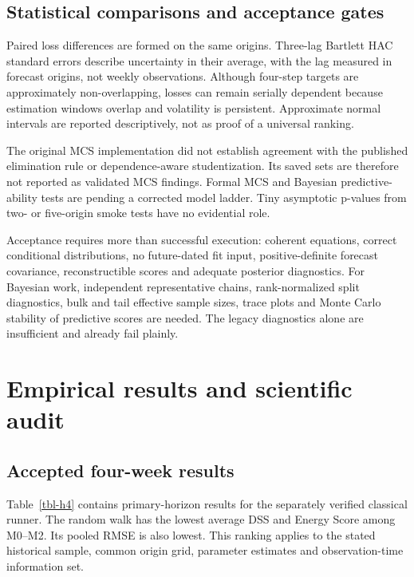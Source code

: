 \documentclass[
  12pt,
  letterpaper,
  DIV=11,
  numbers=noendperiod]{scrreprt}
\begin{document}
\section{Statistical comparisons and acceptance
gates}\label{statistical-comparisons-and-acceptance-gates}

Paired loss differences are formed on the same origins. Three-lag
Bartlett HAC standard errors describe uncertainty in their average, with
the lag measured in forecast origins, not weekly observations. Although
four-step targets are approximately non-overlapping, losses can remain
serially dependent because estimation windows overlap and volatility is
persistent. Approximate normal intervals are reported descriptively, not
as proof of a universal ranking.

The original MCS implementation did not establish agreement with the
published elimination rule or dependence-aware studentization. Its saved
sets are therefore not reported as validated MCS findings. Formal MCS
and Bayesian predictive-ability tests are pending a corrected model
ladder. Tiny asymptotic p-values from two- or five-origin smoke tests
have no evidential role.

Acceptance requires more than successful execution: coherent equations,
correct conditional distributions, no future-dated fit input,
positive-definite forecast covariance, reconstructible scores and
adequate posterior diagnostics. For Bayesian work, independent
representative chains, rank-normalized split diagnostics, bulk and tail
effective sample sizes, trace plots and Monte Carlo stability of
predictive scores are needed. The legacy diagnostics alone are
insufficient and already fail plainly.

\chapter{Empirical results and scientific audit}\label{sec-results}

\section{Accepted four-week results}\label{accepted-four-week-results}

Table~\ref{tbl-h4} contains primary-horizon results for the separately
verified classical runner. The random walk has the lowest average DSS
and Energy Score among M0--M2. Its pooled RMSE is also lowest. This
ranking applies to the stated historical sample, common origin grid,
parameter estimates and observation-time information set.
\end{document}
